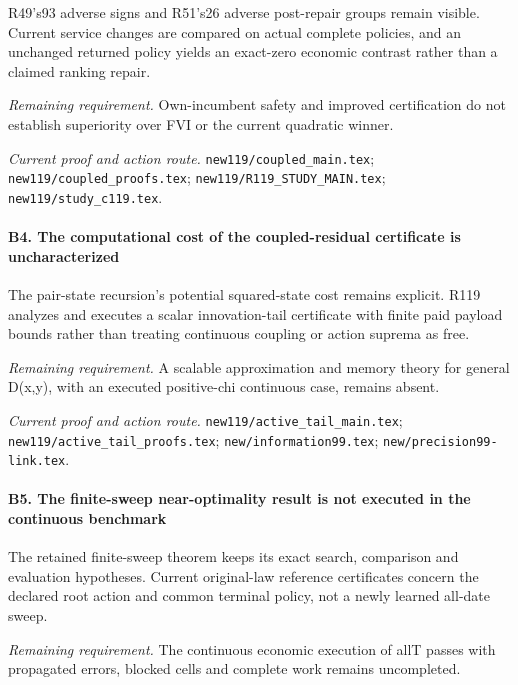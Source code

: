 R49's93 adverse signs and R51's26 adverse post-repair groups remain visible. Current service changes are compared on actual complete policies, and an unchanged returned policy yields an exact-zero economic contrast rather than a claimed ranking repair.

\par\emph{Remaining requirement.} Own-incumbent safety and improved certification do not establish superiority over FVI or the current quadratic winner.

\par\emph{Current proof and action route.} \nolinkurl{new119/coupled_main.tex}; \nolinkurl{new119/coupled_proofs.tex}; \nolinkurl{new119/R119_STUDY_MAIN.tex}; \nolinkurl{new119/study_c119.tex}.

\paragraph{B4. The computational cost of the coupled-residual certificate is uncharacterized}

The pair-state recursion's potential squared-state cost remains explicit. R119 analyzes and executes a scalar innovation-tail certificate with finite paid payload bounds rather than treating continuous coupling or action suprema as free.

\par\emph{Remaining requirement.} A scalable approximation and memory theory for general D(x,y), with an executed positive-chi continuous case, remains absent.

\par\emph{Current proof and action route.} \nolinkurl{new119/active_tail_main.tex}; \nolinkurl{new119/active_tail_proofs.tex}; \nolinkurl{new/information99.tex}; \nolinkurl{new/precision99-link.tex}.

\paragraph{B5. The finite-sweep near-optimality result is not executed in the continuous benchmark}

The retained finite-sweep theorem keeps its exact search, comparison and evaluation hypotheses. Current original-law reference certificates concern the declared root action and common terminal policy, not a newly learned all-date sweep.

\par\emph{Remaining requirement.} The continuous economic execution of allT passes with propagated errors, blocked cells and complete work remains uncompleted.

